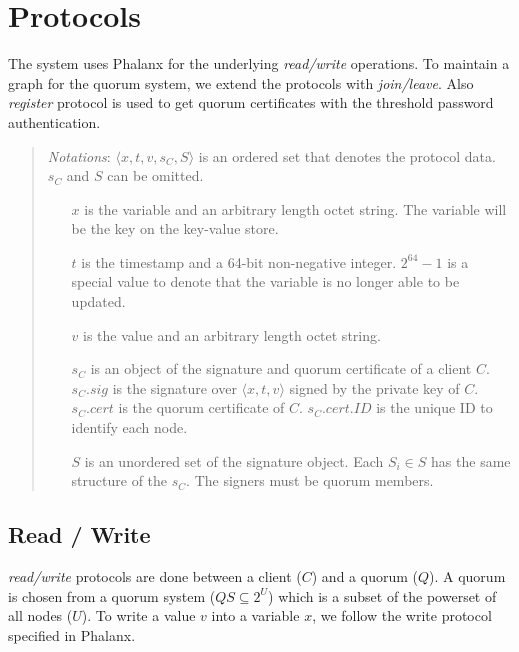 \section{Protocols}
\label{Protocols}
The system uses Phalanx \cite{Delhi:2} for the underlying {\em
read/write} operations. To maintain a graph for the quorum system, we
extend the protocols with {\em join/leave}. Also {\em register}
protocol is used to get quorum certificates with the threshold
password authentication.

\begin{quote}
  {\em Notations}:
  $\langle x, t, v, s_C, S \rangle$ is an ordered set that denotes the protocol
  data. $s_C$ and $S$ can be omitted.
  \begin{itemize}
  \item[$x$] is the variable and an arbitrary length octet string. The variable will
    be the key on the key-value store.
  \item[$t$] is the timestamp and a 64-bit non-negative integer. $2^{64}-1$ is
    a special value to denote that the variable is no longer able to be
    updated.
  \item[$v$] is the value and an arbitrary length octet string.
  \item[$s_C$] is an object of the signature and quorum certificate of a
    client $C$. $s_C.sig$ is the signature over $\langle x, t, v \rangle$ signed by the
    private key of $C$. $s_C.cert$ is the quorum certificate of
    $C$. $s_C.cert.ID$ is the unique ID to identify each node.
  \item[$S$] is an unordered set of the signature object. Each $S_i
    \in S$ has the
    same structure of the $s_C$. The signers must be quorum members.
  \end{itemize}
\end{quote}

\subsection{Read / Write}
\label{rw}
{\em read/write} protocols are done between a client ($C$) and a
quorum ($Q$). A quorum is chosen from a quorum system ($QS \subseteq
2^U$) which is a subset of the powerset of all nodes ($U$).  To write
a value $v$ into a variable $x$, we follow the write protocol
specified in Phalanx.\\

